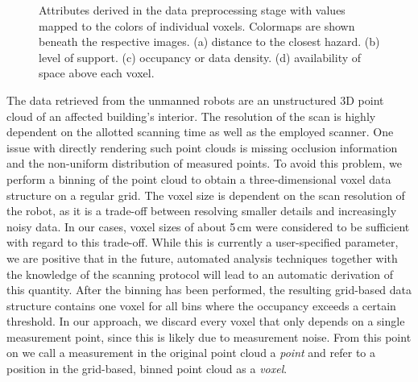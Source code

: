 \documentclass[review,journal]{vgtc}         %
\begin{document}
\begin{figure}
{	    \label{fig:overview:precomputation:occupancyfield}
	}
	\hfill
	\caption{Attributes derived in the data preprocessing stage with values mapped to the colors of individual voxels. Colormaps are shown beneath the respective images. (a) distance to the closest hazard. (b) level of support. (c) occupancy or data density. (d) availability of space above each voxel.}
    \label{fig:overview:precomputation}
\end{figure}

 The data retrieved from the unmanned robots are an unstructured 3D point cloud of an affected building's interior. The resolution of the scan is highly dependent on the allotted scanning time as well as the employed scanner. One issue with directly rendering such point clouds is missing occlusion information and the non-uniform distribution of measured points. To avoid this problem, we perform a binning of the point cloud to obtain a three-dimensional voxel data structure on a regular grid. The voxel size is dependent on the scan resolution of the robot, as it is a trade-off between resolving smaller details and increasingly noisy data. In our cases, voxel sizes of about 5\,cm were considered to be sufficient with regard to this trade-off. While this is currently a user-specified parameter, we are positive that in the future, automated analysis techniques together with the knowledge of the scanning protocol will lead to an automatic derivation of this quantity. After the binning has been performed, the resulting grid-based data structure contains one voxel for all bins where the occupancy exceeds a certain threshold. In our approach, we discard every voxel that only depends on a single measurement point, since this is likely due to measurement noise. From this point on we call a measurement in the original point cloud a \emph{point} and refer to a position in the grid-based, binned point cloud as a \emph{voxel}.
\end{document}

